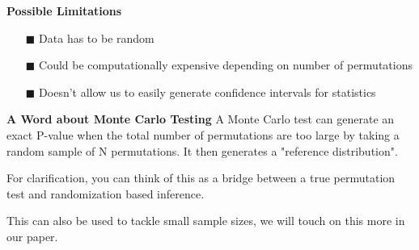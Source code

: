 \documentclass{beamer}
\begin{document}
\begin{frame}{\textbf{Possible Limitations}}
\begin{itemize}
    
        \item[$\blacksquare$] Data has to be random
        
        \item[$\blacksquare$] Could be computationally expensive depending on number of permutations
        
        \item[$\blacksquare$] Doesn't allow us to easily generate confidence intervals for statistics
        
    \end{itemize}
    
\end{frame}
\begin{frame}{\textbf{A Word about Monte Carlo Testing}}
A Monte Carlo test can generate an exact P-value when the total number of permutations are too large by taking a random sample of N permutations. It then generates a "reference distribution". 

\newline\quad
\newline\quad

For clarification, you can think of this as a bridge between a true permutation test and randomization based inference. 

\newline\quad
\newline\quad

This can also be used to tackle small sample sizes, we will touch on this more in our paper.  
\end{frame}
\end{document}
